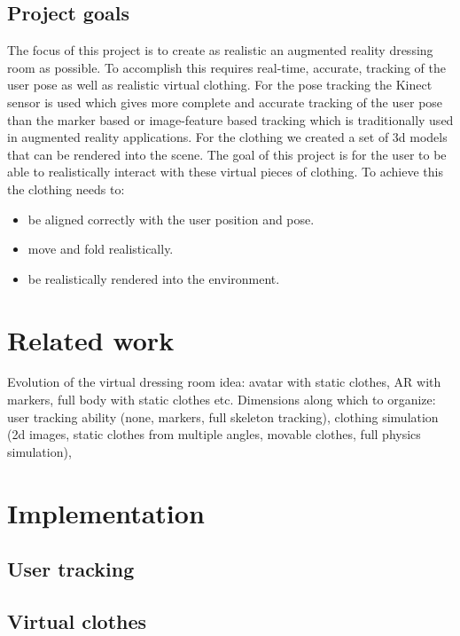 \documentclass[a4paper]{article}
\begin{document}
\subsection{Project goals}

The focus of this project is to create as realistic an augmented reality dressing room as possible. To accomplish this requires real-time, accurate, tracking of the user pose as well as realistic virtual clothing. For the pose tracking the Kinect sensor is used which gives more complete and accurate tracking of the user pose than the marker based or image-feature based tracking which is traditionally used in augmented reality applications. For the clothing we created a set of 3d models that can be rendered into the scene. The goal of this project is for the user to be able to realistically interact with these virtual pieces of clothing. To achieve this the clothing needs to:
\begin{itemize}
\item be aligned correctly with the user position and pose.
\item move and fold realistically. 
\item be realistically rendered into the environment.
\end{itemize}



\section{Related work}

Evolution of the virtual dressing room idea: avatar with static clothes, AR with markers, full body with static clothes etc. Dimensions along which to organize: user tracking ability (none, markers, full skeleton tracking), clothing simulation (2d images, static clothes from multiple angles, movable clothes, full physics simulation),

\section{Implementation}

\subsection{User tracking}

\subsection{Virtual clothes}
\end{document}
